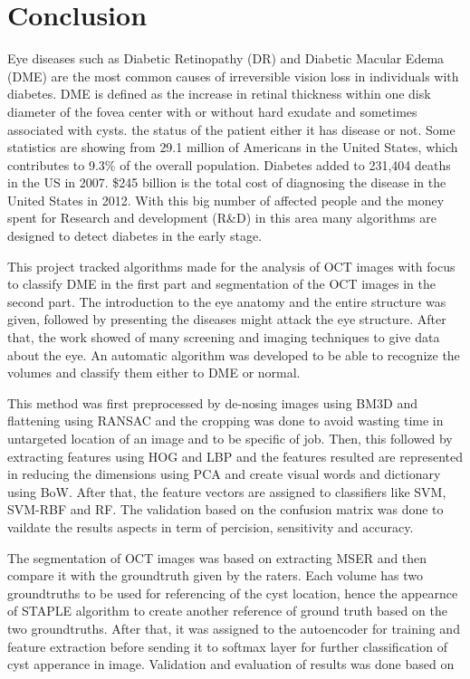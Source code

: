 \chapter{Conclusion} \label{chap:conclusion}
Eye diseases such as Diabetic Retinopathy (DR) and Diabetic Macular Edema (DME) are the most common causes of irreversible vision loss in individuals with diabetes.
DME is defined as the increase in retinal thickness within one disk diameter of the fovea center with or without hard exudate and sometimes associated with cysts.
the status of the patient either it has disease or not.
Some statistics are showing from \cite{national1995diabetes} 29.1 million of Americans in the United States, which contributes to 9.3\% of the overall population.
Diabetes added to 231,404 deaths in the US in 2007.
\$245 billion is the total cost of diagnosing the disease in the United States in 2012.
With this big number of affected people and the money spent for Research and development (R\&D) in this area many algorithms are designed to detect diabetes in the early stage.

This project tracked algorithms made for the analysis of OCT images with focus to classify DME in the first part and segmentation of the OCT images in the second part.
The introduction to the eye anatomy and the entire structure was given, followed by presenting the diseases might attack the eye structure. 
After that, the work showed of many screening and imaging techniques to give data about the eye.
An automatic algorithm was developed to be able to recognize the volumes and classify them either to DME or normal.

This method was first preprocessed by de-nosing images using BM3D and flattening using RANSAC and the cropping was done to avoid wasting time in untargeted location of an image and to be specific of job.
Then, this followed by extracting features using HOG and LBP and the features resulted are represented in reducing the dimensions using PCA and create visual words and dictionary using BoW.
After that, the feature vectors are assigned to classifiers like SVM, SVM-RBF and RF. 
The validation based on the confusion matrix was done to vaildate the results aspects in term of percision, sensitivity and accuracy.

The segmentation of OCT images was based on extracting MSER and then compare it with the groundtruth given by the raters.
Each volume has two groundtruths to be used for referencing of the cyst location, hence the appearnce of STAPLE algorithm to create another reference of ground truth based on the two groundtruths.
After that, it was assigned to the autoencoder for training and feature extraction before sending it to softmax layer for further classification of cyst apperance in image.
Validation and evaluation of results was done based on    


